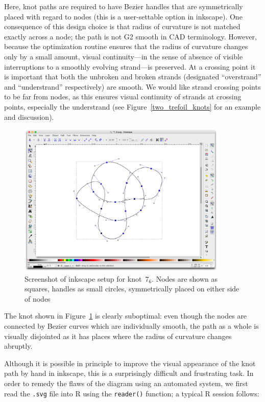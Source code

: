 \documentclass{birkjour}
\theoremstyle{definition}
\theoremstyle{remark}
\numberwithin{equation}{section}
\begin{document}
Here, knot paths are required to have Bezier handles that are
symmetrically placed with regard to nodes (this is a user-settable
option in inkscape).  One consequence of this design choice is that
radius of curvature is not matched exactly across a node; the path is
not G2 smooth in CAD terminology.  However, because the optimization
routine ensures that the radius of curvature changes only by a small
amount, visual continuity---in the sense of absence of visible
interruptions to a smoothly evolving strand---is preserved.  At a
crossing point it is important that both the unbroken and broken
strands (designated ``overstrand'' and ``understrand'' respectively)
are smooth.  We would like strand crossing points to be far from
nodes, as this ensures visual continuity of strands at crossing
points, especially the understrand (see Figure~\ref{two_trefoil_knots}
for an example and discussion).

\begin{figure}[h]
  \centering
    \includegraphics[width=10cm]{screenshot_inkscape_7_6.png} %
\caption{Screenshot of inkscape\label{screenshot_inkscape_7_6} setup
  for knot~$7_6$.  Nodes are shown as squares, handles as small
  circles, symmetrically placed on either side of nodes}
\end{figure}

The knot shown in Figure~\ref{screenshot_inkscape_7_6} is clearly
suboptimal: even though the nodes are connected by Bezier curves which
are individually smooth, the path as a whole is visually disjointed as
it has places where the radius of curvature changes abruptly.

Although it is possible in principle to improve the visual appearance
of the knot path by hand in inkscape, this is a surprisingly difficult
and frustrating task.  In order to remedy the flaws of the diagram
using an automated system, we first read the {\tt .svg} file into R
using the {\tt reader()} function; a typical R session follows:
\end{document}
